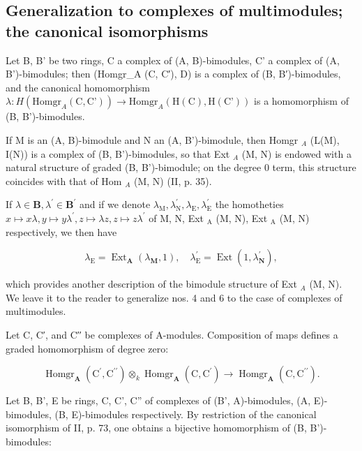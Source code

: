 \subsection{Generalization to complexes of multimodules; the canonical isomorphisms}

Let B, B' be two rings, C a complex of (A, B)-bimodules, C' a complex of (A, B')-bimodules; then (Homgr\_A (C, C′), D) is a complex of (B, B′)-bimodules, and the canonical homomorphism \(\lambda: H(\text{Homgr}_A (\text{C}, \text{C'})) \to \text{Homgr}_A (\text{H}(\text{C}), \text{H}(\text{C'}))\) is a homomorphism of (B, B')-bimodules.

If M is an (A, B)-bimodule and N an (A, B')-bimodule, then Homgr \(_{A}\) (L(M), I(N)) is a complex of (B, B')-bimodules, so that Ext \(_{A}\) (M, N) is endowed with a natural structure of graded (B, B')-bimodule; on the degree 0 term, this structure coincides with that of Hom \(_{A}\) (M, N) (II, p. 35).

If \(\lambda\in\mathbf{B},\lambda^{\prime}\in\mathbf{B}^{\prime}\) and if we denote \(\lambda_{\mathrm{M}},\lambda_{\mathrm{N}}^{\prime},\lambda_{\mathrm{E}},\lambda_{\mathrm{E}}^{\prime}\) the homotheties \(x\mapsto x\lambda,y\mapsto y\lambda^{\prime},z\mapsto\lambda z,z\mapsto z\lambda^{\prime}\) of M, N, Ext \(_{\mathrm{A}}\) (M, N), Ext \(_{\mathrm{A}}\) (M, N) respectively, we then have

\[
\lambda_ {\mathrm{E}} = \operatorname{Ext} _ {\mathbf {A}} \left(\lambda_ {\mathbf {M}}, 1\right), \quad \lambda_ {\mathrm{E}} ^ {\prime} = \operatorname{Ext} \left(1, \lambda_ {\mathbf {N}} ^ {\prime}\right),
\]

which provides another description of the bimodule structure of Ext \(_{A}\) (M, N). We leave it to the reader to generalize nos. 4 and 6 to the case of complexes of multimodules.

Let C, C′, and C′′ be complexes of A-modules. Composition of maps defines a graded homomorphism of degree zero:

\[
\operatorname{Homgr} _ {\mathbf {A}} \left(\mathrm{C} ^ {\prime}, \mathrm{C} ^ {\prime \prime}\right) \otimes_ {k} \operatorname{Homgr} _ {\mathbf {A}} \left(\mathrm{C}, \mathrm{C} ^ {\prime}\right)\rightarrow \operatorname{Homgr} _ {\mathbf {A}} \left(\mathrm{C}, \mathrm{C} ^ {\prime \prime}\right).\tag{14}
\]

Let B, B', E be rings, C, C', C'' of complexes of (B', A)-bimodules, (A, E)-bimodules, (B, E)-bimodules respectively. By restriction of the canonical isomorphism of II, p. 73, one obtains a bijective homomorphism of (B, B')-bimodules:

